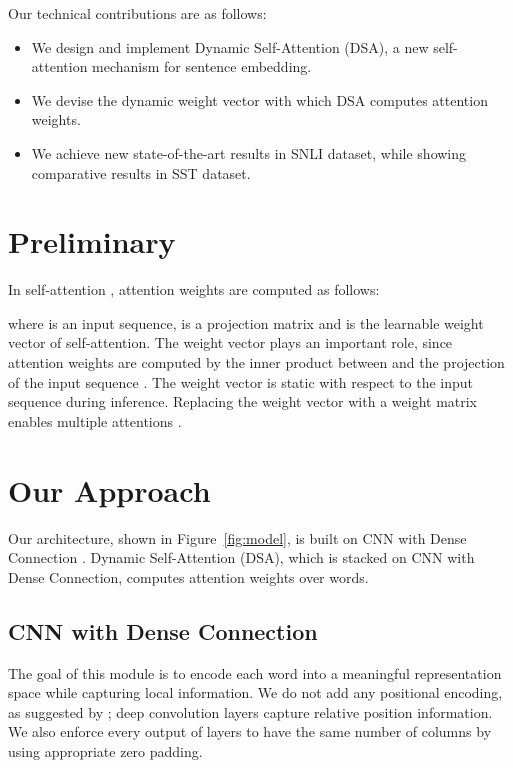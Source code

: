 \documentclass[11pt,a4paper]{article}
\begin{document}
Our technical contributions are as follows:
\noindent\begin{itemize}[parsep=0pt,labelsep=*,leftmargin=1pc]
\item We design and implement Dynamic Self-Attention (DSA), a new self-attention mechanism for sentence embedding.
\item We devise the dynamic weight vector with which DSA computes attention weights.
\item We achieve new state-of-the-art results in SNLI dataset, while showing comparative results in SST dataset. 

\end{itemize}


\section{Preliminary}\label{back}
In self-attention \cite{Yang,hierarchical}, attention weights are computed as follows:

where  is an input sequence,  is a projection matrix and  is the learnable weight vector of self-attention. The weight vector  plays an important role, since attention weights are computed by the inner product between  and the projection of the input sequence . The weight vector  is static with respect to the input sequence  during inference. Replacing the weight vector  with a weight matrix enables multiple attentions \cite{self-attentive,disan}.  

\section{Our Approach}\label{ourapproach}
Our architecture, shown in Figure~\ref{fig:model}, is built on CNN with Dense Connection \cite{dense}. Dynamic Self-Attention (DSA), which is stacked on CNN with Dense Connection, computes attention weights over words.


\subsection{CNN with Dense Connection}\label{module1}
The goal of this module is to encode each word into a meaningful representation space while capturing local information. We do not add any positional encoding, as suggested by \citet{convseq2seq}; deep convolution layers capture relative position information. We also enforce every output of layers to have the same number of columns by using appropriate zero padding.
\end{document}
